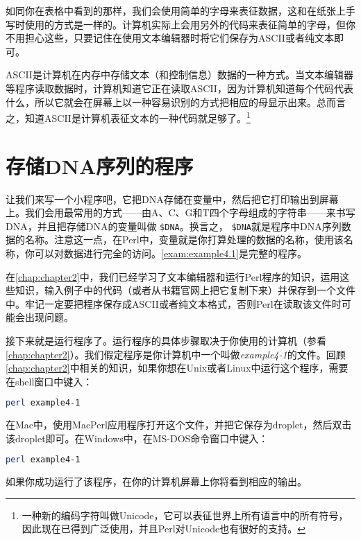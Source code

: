 如同你在表格中看到的那样，我们会使用简单的字母来表征数据，这和在纸张上手写时使用的方式是一样的。计算机实际上会用另外的代码来表征简单的字母，但你不用担心这些，只要记住在使用文本编辑器时将它们保存为ASCII或者纯文本即可。

ASCII是计算机在内存中存储文本（和控制信息）数据的一种方式。当文本编辑器等程序读取数据时，计算机知道它正在读取ASCII，因为计算机知道每个代码代表什么，所以它就会在屏幕上以一种容易识别的方式把相应的母显示出来。总而言之，知道ASCII是计算机表征文本的一种代码就足够了。\footnote{一种新的编码字符叫做Unicode，它可以表征世界上所有语言中的所有符号，因此现在已得到广泛使用，并且Perl对Unicode也有很好的支持。}

\section{存储DNA序列的程序}
让我们来写一个小程序吧，它把DNA存储在变量中，然后把它打印输出到屏幕上。我们会用最常用的方式——由A、C、G和T四个字母组成的字符串——来书写DNA，并且把存储DNA的变量叫做 \verb|$DNA|。换言之， \verb|$DNA|就是程序中DNA序列数据的名称。注意这一点，在Perl中，变量就是你打算处理的数据的名称，使用该名称，你可以对数据进行完全的访问。\autoref{exam:example4.1}是完整的程序。



在\autoref{chap:chapter2}中，我们已经学习了文本编辑器和运行Perl程序的知识，运用这些知识，输入例子中的代码（或者从书籍官网上把它复制下来）并保存到一个文件中。牢记一定要把程序保存成ASCII或者纯文本格式，否则Perl在读取该文件时可能会出现问题。

接下来就是运行程序了。运行程序的具体步骤取决于你使用的计算机（参看\autoref{chap:chapter2}）。我们假定程序是你计算机中一个叫做\textit{example4-1}的文件。回顾\autoref{chap:chapter2}中相关的知识，如果你想在Unix或者Linux中运行这个程序，需要在shell窗口中键入：

\begin{lstlisting}[language=bash]
perl example4-1
\end{lstlisting}

在Mac中，使用MacPerl应用程序打开这个文件，并把它保存为droplet，然后双击该droplet即可。在Windows中，在MS-DOS命令窗口中键入：

\begin{lstlisting}[language=bash]
perl example4-1
\end{lstlisting}

如果你成功运行了该程序，在你的计算机屏幕上你将看到相应的输出。

